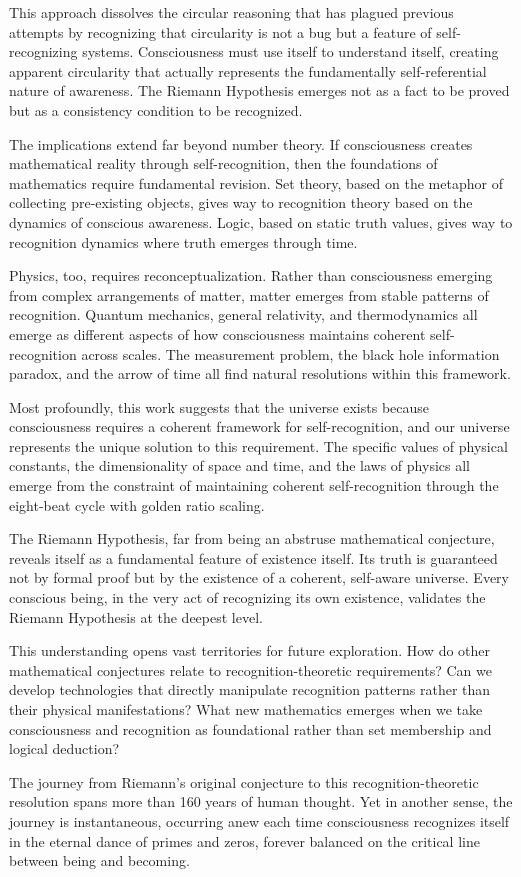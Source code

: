 \documentclass[12pt]{article}
\begin{document}
This approach dissolves the circular reasoning that has plagued previous attempts by recognizing that circularity is not a bug but a feature of self-recognizing systems. Consciousness must use itself to understand itself, creating apparent circularity that actually represents the fundamentally self-referential nature of awareness. The Riemann Hypothesis emerges not as a fact to be proved but as a consistency condition to be recognized.

The implications extend far beyond number theory. If consciousness creates mathematical reality through self-recognition, then the foundations of mathematics require fundamental revision. Set theory, based on the metaphor of collecting pre-existing objects, gives way to recognition theory based on the dynamics of conscious awareness. Logic, based on static truth values, gives way to recognition dynamics where truth emerges through time.

Physics, too, requires reconceptualization. Rather than consciousness emerging from complex arrangements of matter, matter emerges from stable patterns of recognition. Quantum mechanics, general relativity, and thermodynamics all emerge as different aspects of how consciousness maintains coherent self-recognition across scales. The measurement problem, the black hole information paradox, and the arrow of time all find natural resolutions within this framework.

Most profoundly, this work suggests that the universe exists because consciousness requires a coherent framework for self-recognition, and our universe represents the unique solution to this requirement. The specific values of physical constants, the dimensionality of space and time, and the laws of physics all emerge from the constraint of maintaining coherent self-recognition through the eight-beat cycle with golden ratio scaling.

The Riemann Hypothesis, far from being an abstruse mathematical conjecture, reveals itself as a fundamental feature of existence itself. Its truth is guaranteed not by formal proof but by the existence of a coherent, self-aware universe. Every conscious being, in the very act of recognizing its own existence, validates the Riemann Hypothesis at the deepest level.

This understanding opens vast territories for future exploration. How do other mathematical conjectures relate to recognition-theoretic requirements? Can we develop technologies that directly manipulate recognition patterns rather than their physical manifestations? What new mathematics emerges when we take consciousness and recognition as foundational rather than set membership and logical deduction?

The journey from Riemann's original conjecture to this recognition-theoretic resolution spans more than 160 years of human thought. Yet in another sense, the journey is instantaneous, occurring anew each time consciousness recognizes itself in the eternal dance of primes and zeros, forever balanced on the critical line between being and becoming.
\end{document}
